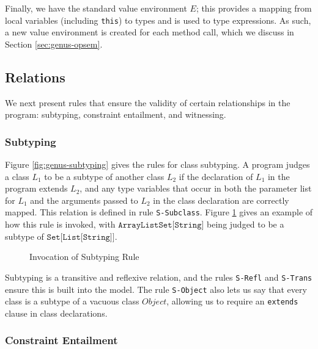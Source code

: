 Finally, we have the standard value environment $E$; this provides a mapping from local variables (including \texttt{this}) to types and is used to type expressions. As such, a new value environment is created for each method call, which we discuss in Section \ref{sec:genus-opsem}.

\subsection{Relations}

We next present rules that ensure the validity of certain relationships in the program: subtyping, constraint entailment, and witnessing.

\subsubsection{Subtyping}

Figure \ref{fig:genus-subtyping} gives the rules for class subtyping. A program judges a class $L_1$ to be a subtype of another class $L_2$ if the declaration of $L_1$ in the program extends $L_2$, and any type variables that occur in both the parameter list for $L_1$ and the arguments passed to $L_2$ in the class declaration are correctly mapped. This relation is defined in rule \texttt{S-Subclass}. Figure \ref{fig:subtype-example} gives an example of how this rule is invoked, with $\texttt{ArrayListSet[String]}$ being judged to be a subtype of $\texttt{Set[List[String]]}$. \\

\begin{figure}[h]
    \centering
    \begin{mathpar}
    \end{mathpar}
    \caption{Invocation of Subtyping Rule}
    \label{fig:subtype-example}
\end{figure}

Subtyping is a transitive and reflexive relation, and the rules \texttt{S-Refl} and \texttt{S-Trans} ensure this is built into the model. The rule \texttt{S-Object} also lets us say that every class is a subtype of a vacuous class $Object$, allowing us to require an \texttt{extends} clause in class declarations.

\subsubsection{Constraint Entailment}

